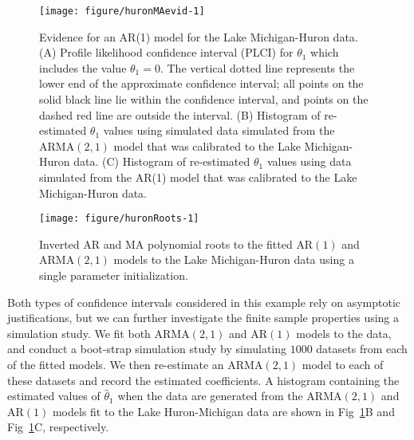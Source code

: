 \begin{figure}[!ht]
\begin{knitrout}
\color{fgcolor}

{\centering \texttt{[image: figure/huronMAevid-1]} 

}


\end{knitrout}
\caption{\label{fig:huronMAevid}Evidence for an AR(1) model for the Lake Michigan-Huron data. (A) Profile likelihood confidence interval (PLCI) for $\theta_1$ which includes the value $\theta_1 = 0$. The vertical dotted line represents the lower end of the approximate confidence interval; all points on the solid black line lie within the confidence interval, and points on the dashed red line are outside the interval. (B) Histogram of re-estimated $\theta_1$ values using simulated data simulated from the $\text{ARMA}(2, 1)$ model that was calibrated to the Lake Michigan-Huron data. (C) Histogram of re-estimated $\theta_1$ values using data simulated from the AR(1) model that was calibrated to the Lake Michigan-Huron data.}
\end{figure}

\begin{figure}[!ht]
\begin{knitrout}
\color{fgcolor}

{\centering \texttt{[image: figure/huronRoots-1]} 

}


\end{knitrout}
\caption{\label{fig:huronRoots}Inverted AR and MA polynomial roots to the fitted $\text{AR}(1)$ and $\text{ARMA}(2, 1)$ models to the Lake Michigan-Huron data using a single parameter initialization.}
\end{figure}

Both types of confidence intervals considered in this example rely on asymptotic justifications, but we can further investigate the finite sample properties using a simulation study.
We fit both $\text{ARMA}(2, 1)$ and $\text{AR}(1)$ models to the data, and conduct a boot-strap simulation study by simulating $1000$ datasets from each of the fitted models.
We then re-estimate an $\text{ARMA}(2, 1)$ model to each of these datasets and record the estimated coefficients.
A histogram containing the estimated values of $\hat{\theta}_1$ when the data are generated from the $\text{ARMA}(2, 1)$ and $\text{AR}(1)$ models fit to the Lake Huron-Michigan data are shown in Fig~\ref{fig:huronMAevid}B and Fig~\ref{fig:huronMAevid}C, respectively.

